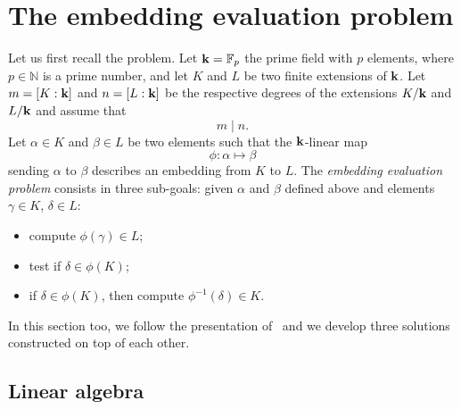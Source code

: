 \section{The embedding evaluation problem}
\label{sec:evaluation}

Let us first recall the problem. Let $\mathbf{k}=\mathbb{F}_p$ the prime field with $p$
elements, where $p\in\mathbb{N}$ is a prime number, and let $K$ and $L$ be
two finite extensions of $\mathbf{k}$. Let $m=\left[ K:\mathbf{k} \right]$ and $n = \left[ L:\mathbf{k}
\right]$ be the respective degrees of the extensions $K/\mathbf{k}$ and $L/\mathbf{k}$ and
assume that
\[
  m\mid n.
\]
Let $\alpha\in K$ and $\beta\in L$ be two elements such that the $\mathbf{k}$-linear map
\[
  \phi:\alpha\mapsto\beta
\]
sending $\alpha$ to $\beta$ describes an embedding from $K$ to $L$. The
\emph{embedding evaluation problem} consists in three sub-goals: given $\alpha$
and $\beta$ defined above and elements $\gamma\in K$, $\delta\in L$:
\begin{itemize}
  \item compute $\phi(\gamma)\in L$;
  \item test if $\delta\in\phi(K)$;
  \item if $\delta\in\phi(K)$, then compute $\phi^{-1}(\delta)\in K$.
\end{itemize}
In this section too, we follow the presentation of~\cite{BDDFS17} and we develop
three solutions constructed on top of each other.

\subsection{Linear algebra}
\label{sec:linalg}

